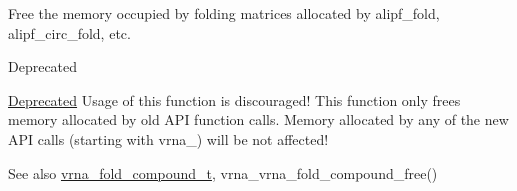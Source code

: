 Free the memory occupied by folding matrices allocated by alipf\+\_\+fold, alipf\+\_\+circ\+\_\+fold, etc. 

\begin{DoxyRefDesc}{Deprecated}
\item[\hyperlink{deprecated__deprecated000022}{Deprecated}]Usage of this function is discouraged! This function only free\textquotesingle{}s memory allocated by old A\+PI function calls. Memory allocated by any of the new A\+PI calls (starting with vrna\+\_\+) will be not affected!\end{DoxyRefDesc}


\begin{DoxySeeAlso}{See also}
\hyperlink{group__fold__compound_ga1b0cef17fd40466cef5968eaeeff6166}{vrna\+\_\+fold\+\_\+compound\+\_\+t}, vrna\+\_\+vrna\+\_\+fold\+\_\+compound\+\_\+free() 
\end{DoxySeeAlso}
